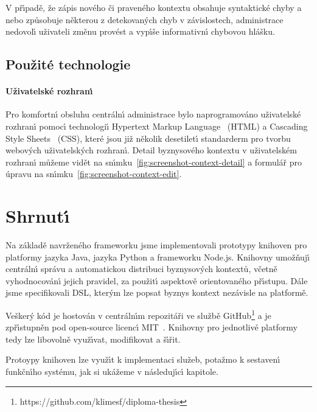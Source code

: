 V př\'{\i}padě, že zápis nového či praveného kontextu obsahuje syntaktické
chyby a nebo způsobuje některou z detekovan\'ych chyb v závislostech,
administrace nedovol\'{\i} uživateli změnu provést a vyp\'{\i}še informativn\'{\i}
chybovou hlášku.

\subsection{Použité technologie}

\paragraph{Uživatelské rozhran\'{\i}}
Pro komfortn\'{\i} obsluhu centráln\'{\i} administrace bylo naprogramováno
uživatelské rozhran\'{\i} pomoc\'{\i} technologi\'{\i} Hypertext Markup Language~\cite{berners1995hypertext}
(HTML) a Cascading Style Sheets~\cite{bos1998cascading} (\gls{CSS}), které jsou již několik
desetilet\'{\i} standarderm pro tvorbu webov\'ych uživatelsk\'ych rozhran\'{\i}.
Detail byznysového kontextu v uživatelském rozhran\'{\i} můžeme vidět na sn\'{\i}mku~\ref{fig:screenshot-context-detail}
a formulář pro úpravu na sn\'{\i}mku~\ref{fig:screenshot-context-edit}.


\section{Shrnut\'{\i}}

Na základě navrženého frameworku jsme implementovali prototypy
knihoven pro platformy jazyka Java, jazyka Python a frameworku
Node.js. Knihovny umožňuj\'{\i} centráln\'{\i} správu a automatickou distribuci
byznysov\'ych kontextů, včetně vyhodnocován\'{\i} jejich pravidel, za
použit\'{\i} aspektově orientovaného př\'{\i}stupu.
Dále jsme specifikovali \gls{DSL}, kter\'ym lze popsat byznys kontext
nezávisle na platformě.

Vešker\'y kód je hostován v centráln\'{\i}m repozitáři
ve službě GitHub\footnote{
https://github.com/klimesf/diploma-thesis
} a je zpř\'{\i}stupněn pod open-source licenc\'{\i} MIT~\cite{mitlicense}.
Knihovny pro jednotlivé platformy tedy lze libovolně
využ\'{\i}vat, modifikovat a š\'{\i}řit.

Protoypy knihoven lze využ\'{\i}t k implementaci služeb,
potažmo k sestaven\'{\i} funkčn\'{\i}ho systému, jak si ukážeme
v následuj\'{\i}c\'{\i} kapitole.
